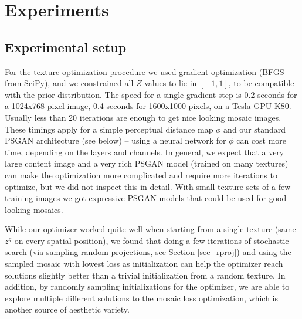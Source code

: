 \documentclass{article}
\begin{document}
\section{Experiments}

\subsection{Experimental setup}\label{sec_bfgs}
For the texture optimization procedure we used gradient optimization (BFGS from SciPy), and we constrained all $Z$ values to lie in $[-1,1]$, to be compatible with the prior distribution. 
The speed for a single gradient step is 0.2 seconds for a 1024x768 pixel image, 0.4 seconds for 1600x1000 pixels, on a Tesla GPU K80. Usually less than 20 iterations are enough to get nice looking mosaic images. 
These timings apply for a simple perceptual distance map $\phi$ and our standard PSGAN architecture (see below) -- using a neural network for $\phi$ can cost more time, depending on the layers and channels. In general, we expect that a very large content image and a very rich PSGAN model (trained on many textures) can make the optimization more complicated and require more iterations to optimize, but we did not inspect this in detail. With small texture sets of a few training images we got expressive PSGAN models that could be used for good-looking mosaics.

While our optimizer worked quite well when starting from a single texture (same $z^g$ on every spatial position), we found that doing a few iterations of stochastic search (via sampling random projections, see Section \ref{sec_rproj}) and using the sampled mosaic with lowest loss as initialization can help the optimizer reach solutions slightly better than a trivial initialization from a random texture. In addition, by randomly sampling initializations for the optimizer, we are able to explore multiple different solutions to the mosaic loss optimization, which is another source of aesthetic variety.
\end{document}
